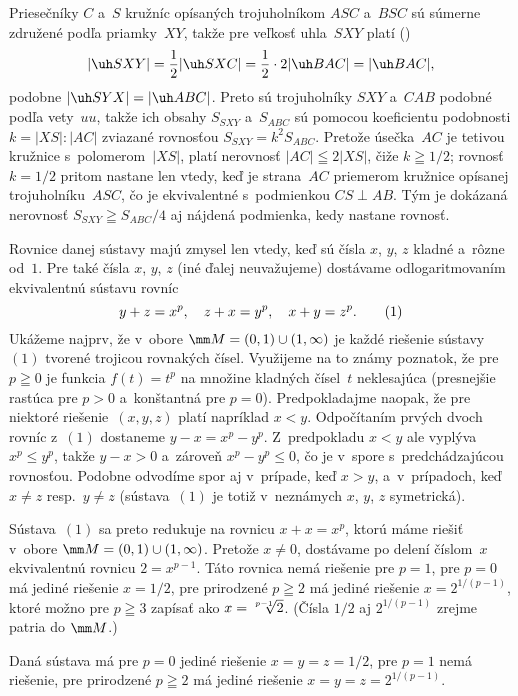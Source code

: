 {\ineriesenie
Priesečníky $C$ a~$S$ kružníc opísaných
trojuholníkom $ASC$ a~$BSC$ sú súmerne združené podľa priamky~$XY$,
takže pre veľkosť uhla~$SXY$ platí (\obr)
$$
|\uh SXY|=\frac12|\uh SXC|=\frac12\cdot2|\uh BAC|=|\uh BAC|,
$$
podobne $|\uh SYX|=|\uh ABC|$. Preto sú trojuholníky $SXY$ a~$CAB$
podobné podľa vety~$uu$, takže ich obsahy $S_{SXY}$ 
a~$S_{ABC}$ sú pomocou koeficientu podobnosti $k=|XS|:|AC|$
zviazané rovnosťou $S_{SXY}=k^2 S_{ABC}$. Pretože úsečka~$AC$
je tetivou kružnice s~polomerom~$|XS|$, platí nerovnosť $|AC|\leqq
2|XS|$, čiže $k\geqq 1/2$; rovnosť $k=1/2$ pritom
nastane len vtedy, keď je strana~$AC$ priemerom kružnice opísanej
trojuholníku~$ASC$, čo je ekvivalentné s~podmienkou $CS\perp AB$. Tým je
dokázaná nerovnosť $S_{SXY}\geqq S_{ABC}/4$ aj nájdená
podmienka, kedy nastane rovnosť.}

{%
Rovnice danej sústavy majú zmysel len vtedy, keď sú
čísla $x$, $y$, $z$ kladné a~rôzne od~$1$. Pre také čísla
$x$, $y$, $z$ (iné ďalej neuvažujeme) dostávame odlogaritmovaním
ekvivalentnú sústavu rovníc
$$
y+z=x^p,\quad z+x=y^p,\quad x+y=z^p.
\tag1
$$
Ukážeme najprv, že v~obore $\mm M=(0,1)\cup(1,\infty)$ je každé
riešenie sústavy~$(1)$ tvorené trojicou rovnakých čísel. Využijeme
na to známy poznatok, že pre $p\geqq 0$ je funkcia $f(t)=t^p$
na množine kladných čísel~$t$ neklesajúca (presnejšie rastúca pre
$p>0$ a~konštantná pre $p=0$). Predpokladajme naopak, že pre niektoré
riešenie~$(x,y,z)$ platí napríklad $x<y$.
Odpočítaním prvých dvoch rovníc z~$(1)$ dostaneme $y-x=x^p-y^p$.
Z~predpokladu $x<y$ ale vyplýva $x^p\le y^p$, takže $y-x>0$ 
a~zároveň $x^p-y^p\le 0$, čo je v~spore s~predchádzajúcou rovnosťou.
Podobne odvodíme spor aj v~prípade, keď $x>y$, a~v~prípadoch, keď
$x\ne z$ resp.~$y\ne z$ (sústava~$(1)$ je totiž v~neznámych $x$,
$y$, $z$ symetrická).

Sústava~$(1)$ sa preto redukuje na rovnicu $x+x=x^p$, ktorú máme
riešiť v~obore $\mm M=(0,1)\cup(1,\infty)$. Pretože $x\ne0$,
dostávame po delení číslom~$x$ ekvivalentnú rovnicu $2=x^{p-1}$.
Táto rovnica nemá riešenie pre $p=1$, pre $p=0$ má jediné riešenie
$x=1/2$, pre prirodzené $p\geqq2$ má jediné riešenie
$x=2^{1/(p-1)}$, ktoré možno pre $p\geqq3$ zapísať ako
$x=\root{p-1}\of{2}$. (Čísla $1/2$ aj $2^{1/(p-1)}$
zrejme patria do $\mm M$.)

\odpoved
Daná sústava má pre $p=0$ jediné riešenie
$x=y=z=1/2$, pre $p=1$ nemá riešenie, pre prirodzené $p\geqq2$
má jediné riešenie $x=y=z=2^{1/(p-1)}$.}

